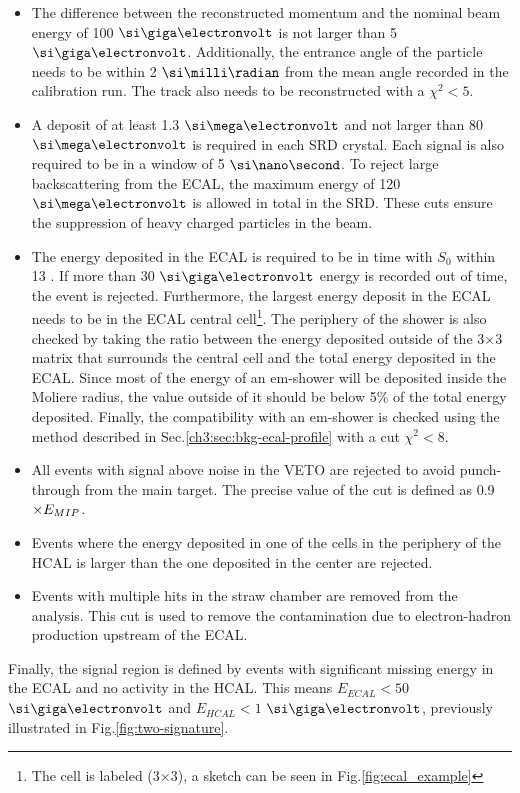\begin{itemize}
\item The difference between the reconstructed momentum and the nominal beam energy of 100 $\gev$ is not larger than 5 $\gev$. Additionally, the entrance angle of the particle needs to be within 2 $\mrad$ from the mean angle recorded in the calibration run. The track also needs to be reconstructed with a $\chi^2<5$.
\item A deposit of at least 1.3 $\mev$ and not larger than 80 $\mev$ is required in each SRD crystal. Each signal is also required to be in a window of 5 $\nas$. To reject large backscattering from the ECAL, the maximum energy of 120 $\mev$ is allowed in total in the SRD. These cuts ensure the suppression of heavy charged particles in the beam.
\item The energy deposited in the ECAL is required to be in time with $S_0$ within 13 \nas. If more than 30 $\gev$ energy is recorded out of time, the event is rejected. Furthermore, the largest energy deposit in the ECAL needs to be in the ECAL central cell\footnote{The cell is labeled (3$\times$3), a sketch can be seen in Fig.\ref{fig:ecal_example}}. The periphery of the shower is also checked by taking the ratio between the energy deposited outside of the 3$\times$3 matrix that surrounds the central cell and the total energy deposited in the ECAL. Since most of the energy of an em-shower will be deposited inside the Moliere radius, the value outside of it should be below 5\% of the total energy deposited. Finally, the compatibility with an em-shower is checked using the method described in Sec.\ref{ch3:sec:bkg-ecal-profile} with a cut $\chi^2 < 8$.
\item All events with signal above noise in the VETO are rejected to avoid punch-through from the main target. The precise value of the cut is defined as 0.9$\times E_{MIP}$.
\item Events where the energy deposited in one of the cells in the periphery of the HCAL is larger than the one deposited in the center are rejected.
\item Events with multiple hits in the straw chamber are removed from the analysis. This cut is used to remove the contamination due to electron-hadron production upstream of the ECAL.
\end{itemize}

Finally, the signal region is defined by events with significant missing energy in the ECAL and no activity in the HCAL. This means $E_{ECAL} < 50$ $\gev$ and $E_{HCAL} < 1$ $\gev$, previously illustrated in Fig.\ref{fig:two-signature}.

